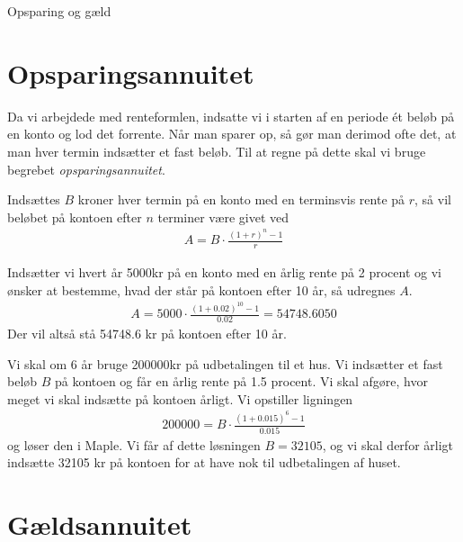 

\begin{center}
\Huge
Opsparing og gæld
\end{center}

\section*{Opsparingsannuitet}

Da vi arbejdede med renteformlen, indsatte vi i starten af en periode ét beløb på en konto og lod det forrente. Når man sparer op, så gør man derimod ofte det, at man hver termin indsætter et fast beløb. Til at regne på dette skal vi bruge begrebet \textit{opsparingsannuitet}.

\begin{setn}[Opsparingsannuitet]
	Indsættes $B$ kroner hver termin på en konto med en terminsvis rente på $r$, så vil beløbet på kontoen efter $n$ terminer være givet ved
	\begin{align*}
		A = B \cdot \frac{(1+r)^n-1}{r}
	\end{align*}
\end{setn}

\begin{exa}
	Indsætter vi hvert år 5000kr på en konto med en årlig rente på 2 procent og vi ønsker at bestemme, hvad der står på kontoen efter 10 år, så udregnes $A$.
	\begin{align*}
		A = 5000\cdot \frac{(1+0.02)^{10}-1}{0.02} = 54748.6050
	\end{align*}
	Der vil altså stå 54748.6 kr på kontoen efter 10 år.
\end{exa}

\begin{exa}
	Vi skal om 6 år bruge 200000kr på udbetalingen til et hus. Vi indsætter et fast beløb $B$ på kontoen og får en årlig rente på 1.5 procent. Vi skal afgøre, hvor meget vi 
	skal indsætte på kontoen årligt. Vi opstiller ligningen
	\begin{align*}
		200000 = B\cdot \frac{(1+0.015)^6-1}{0.015}
	\end{align*}
	og løser den i Maple. Vi får af dette løsningen $B = 32105$, og vi skal derfor årligt indsætte 32105 kr på kontoen for at have nok til udbetalingen af huset.  
\end{exa}
\section*{Gældsannuitet}

